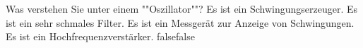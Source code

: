     {Was verstehen Sie unter einem ""Oszillator""?}
    {Es ist ein Schwingungserzeuger.}
    {Es ist ein sehr schmales Filter.}
    {Es ist ein Messgerät zur Anzeige von Schwingungen.}
    {Es ist ein Hochfrequenzverstärker.}
    {false}{false}